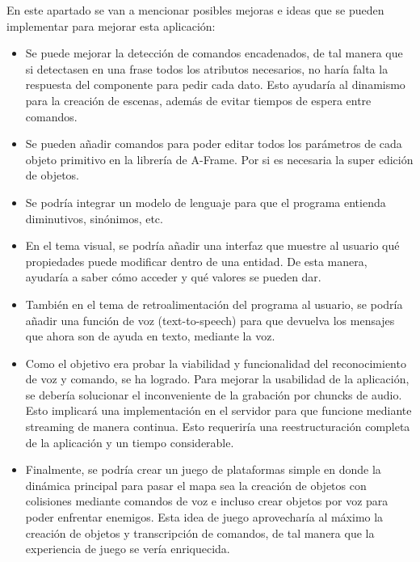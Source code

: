 \documentclass[a4paper, 12pt]{book}
\let\cleardoublepage\clearpage
\begin{document}
En este apartado se van a mencionar posibles mejoras e ideas que se pueden implementar para mejorar esta aplicación:
\begin{itemize}
  \item Se puede mejorar la detección de comandos encadenados, de tal manera que si detectasen en una frase todos los atributos necesarios, no haría falta la respuesta del componente para pedir cada dato.
  Esto ayudaría al dinamismo para la creación de escenas, además de evitar tiempos de espera entre comandos.
  \item Se pueden añadir comandos para poder editar todos los parámetros de cada objeto primitivo en la librería de A-Frame. Por si es necesaria la super edición de objetos.
  \item Se podría integrar un modelo de lenguaje para que el programa entienda diminutivos, sinónimos, etc.
  \item En el tema visual, se podría añadir una interfaz que muestre al usuario qué propiedades puede modificar dentro de una entidad. De esta manera, ayudaría a saber cómo acceder y qué valores se pueden dar.
  \item También en el tema de retroalimentación del programa al usuario, se podría añadir una función de voz (text-to-speech) para que devuelva los mensajes que ahora son de ayuda en texto, mediante la voz.
  \item Como el objetivo era probar la viabilidad y funcionalidad del reconocimiento de voz y comando, se ha logrado. 
Para mejorar la usabilidad de la aplicación, se debería solucionar el inconveniente de la grabación por chuncks de audio. Esto implicará una implementación en el servidor para que funcione mediante streaming de manera continua. 
Esto requeriría una reestructuración completa de la aplicación y un tiempo considerable. 
  \item Finalmente, se podría crear un juego de plataformas simple en donde la dinámica principal para pasar el mapa sea la creación de objetos con colisiones mediante comandos de voz e incluso crear objetos por voz para poder enfrentar enemigos. Esta idea de juego aprovecharía al máximo la creación de objetos y transcripción de comandos, de tal manera que la experiencia de juego se vería enriquecida.
\end{itemize}
\cleardoublepage


\cleardoublepage


\end{document}
